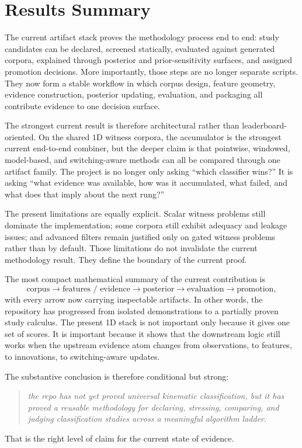 \documentclass[11pt]{article}
\begin{document}
\section{Results Summary}
The current artifact stack proves the methodology process end to end: study
candidates can be declared, screened statically, evaluated against generated
corpora, explained through posterior and prior-sensitivity surfaces, and
assigned promotion decisions. More importantly, those steps are no longer
separate scripts. They now form a stable workflow in which corpus design,
feature geometry, evidence construction, posterior updating, evaluation, and
packaging all contribute evidence to one decision surface.

The strongest current result is therefore architectural rather than
leaderboard-oriented. On the shared \(1\text{D}\) witness corpora, the
accumulator is the strongest current end-to-end combiner, but the deeper claim
is that pointwise, windowed, model-based, and switching-aware methods can all
be compared through one artifact family. The project is no longer only asking
``which classifier wins?'' It is asking ``what evidence was available, how was
it accumulated, what failed, and what does that imply about the next rung?''

The present limitations are equally explicit. Scalar witness problems still
dominate the implementation; some corpora still exhibit adequacy and leakage
issues; and advanced filters remain justified only on gated witness problems
rather than by default. Those limitations do not invalidate the current
methodology result. They define the boundary of the current proof.

The most compact mathematical summary of the current contribution is
\begin{equation}
\text{corpus}
\rightarrow
\text{features / evidence}
\rightarrow
\text{posterior}
\rightarrow
\text{evaluation}
\rightarrow
\text{promotion},
\end{equation}
with every arrow now carrying inspectable artifacts. In other words, the
repository has progressed from isolated demonstrations to a partially proven
study calculus. The present 1D stack is not important only because it gives one
set of scores. It is important because it shows that the downstream logic still
works when the upstream evidence atom changes from observations, to features,
to innovations, to switching-aware updates.

The substantive conclusion is therefore conditional but strong:
\begin{quote}
\textit{the repo has not yet proved universal kinematic classification, but it
has proved a reusable methodology for declaring, stressing, comparing, and
judging classification studies across a meaningful algorithm ladder.}
\end{quote}
That is the right level of claim for the current state of evidence.
\end{document}
